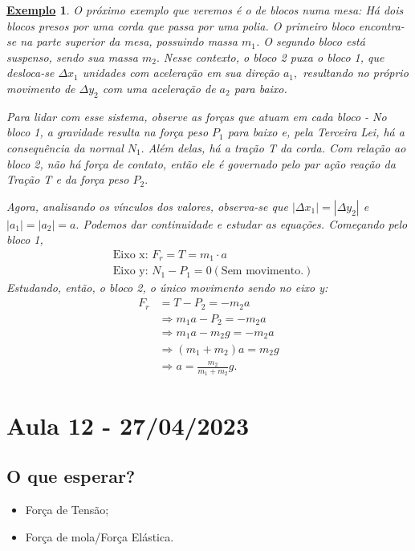 \documentclass{article}
\newtheorem{example}{\underline{Exemplo}}
\begin{document}
\begin{example}
   O próximo exemplo que veremos é o de blocos numa mesa: Há dois blocos presos por uma corda que passa por uma polia.
  O primeiro bloco encontra-se na parte superior da mesa, possuindo massa $m_{1}$. O segundo bloco está suspenso, sendo
  sua massa $m_{2}.$ Nesse contexto, o bloco 2 puxa o bloco 1, que desloca-se $\Delta x_{1}$ unidades com aceleração em sua direção
  $a_{1},$ resultando no próprio movimento de $\Delta y_{2}$ com uma aceleração de $a_{2}$ para baixo.

  Para lidar com esse sistema, observe as forças que atuam em cada bloco - No bloco 1, a gravidade resulta na força
  peso $P_{1}$ para baixo e, pela Terceira Lei, há a consequência da normal $N_{1}.$ Além delas, há a tração T da corda.
  Com relação ao bloco 2, não há força de contato, então ele é governado pelo par ação reação da Tração T e da força
  peso $P_{2}.$

  Agora, analisando os vínculos dos valores, observa-se que $|\Delta x_{1}|=|\Delta y_{2}|$ e $|a_{1}| = |a_{2}| = a.$
  Podemos dar continuidade e estudar as equações. Começando pelo bloco 1, 
 \begin{align*}
   &\text{Eixo x: } F_{r} = T = m_{1}\cdot a\\
   &\text{Eixo y: } N_{1} - P_{1} = 0 (\text{Sem movimento.})
 \end{align*}
 Estudando, então, o bloco 2, o único movimento sendo no eixo y: 
\begin{align*}
  F_{r} &= T - P_{2} = -m_{2}a\\
        &\Rightarrow m_{1}a - P_{2} = -m_{2}a\\
        &\Rightarrow m_{1}a - m_{2}g = -m_{2}a\\
        &\Rightarrow (m_{1}+m_{2})a = m_{2}g\\
        &\Rightarrow a = \frac{m_{2}}{m_{1}+m_{2}}g.
\end{align*}

\end{example}
 \newpage

\section{Aula 12 - 27/04/2023}
\subsection{O que esperar?} 
\begin{itemize}
  \item For\c ca de Tens\~ao;
  \item For\c ca de mola/For\c ca El\'astica.
\end{itemize}
\end{document}
